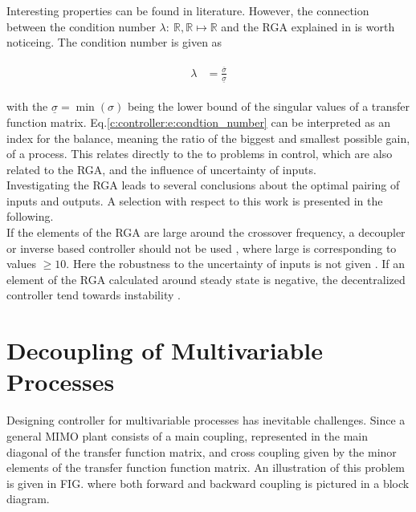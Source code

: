 Interesting properties can be found in literature. However, the connection between the condition number $\lambda:~\mathbb{R},\mathbb{R} \mapsto \mathbb{R}$ and the RGA explained in \cite[p.88 f.]{Skogestad2005} is worth noticeing. The condition number is given as

\begin{align}
\begin{split}
\lambda &= \frac{\overline{\sigma}}{\underline{\sigma}}
\end{split}
\label{c:controller:e:condtion_number}
\end{align}

with the $\underline{\sigma} = \min(\sigma)$ being the lower bound of the singular values of a transfer function matrix. Eq.\ref{c:controller:e:condtion_number} can be interpreted as an index for the balance, meaning the ratio of the biggest and smallest possible gain, of a process. This relates directly to the to problems in control, which are also related to the RGA, and the influence of uncertainty of inputs.\\

Investigating the RGA leads to several conclusions about the optimal pairing of inputs and outputs. A selection with respect to this work is presented in the following.\\

If the elements of the RGA are large around the crossover frequency, a decoupler or inverse based controller should not be used \cite[p. 89]{Skogestad2005}, where large is corresponding to values $\geq 10$. Here the robustness to the uncertainty of inputs is not given \cite[p.243]{Skogestad2005}. If an element of the RGA calculated around steady state is negative, the decentralized controller tend towards instability \cite[p.90, p.447]{Skogestad2005}. \pagebreak

\section{Decoupling of Multivariable Processes} %
\label{c:controller:s:decoupling}

Designing controller for multivariable processes has inevitable challenges. Since a general MIMO plant consists of a main coupling, represented in the main diagonal of the transfer function matrix, and cross coupling given by the minor elements of the transfer function function matrix. An illustration of this problem is given in FIG. where both forward and backward coupling is pictured in a block diagram.\\


